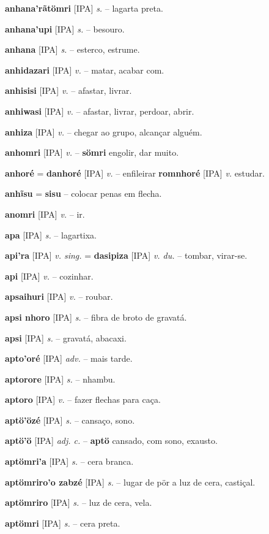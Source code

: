 \textbf{anhana'rãtömri} [IPA] \textit{s.} -- lagarta preta.

\textbf{anhana'upi} [IPA] \textit{s.} -- besouro.

\textbf{anhana} [IPA] \textit{s.} -- esterco, estrume.

\textbf{anhidazari} [IPA] \textit{v.} -- matar, acabar com.

\textbf{anhisisi} [IPA] \textit{v.} -- afastar, livrar.

\textbf{anhiwasi} [IPA] \textit{v.} -- afastar, livrar, perdoar, abrir.

\textbf{anhiza} [IPA] \textit{v.} -- chegar ao grupo, alcançar alguém.

\textbf{anhomri} [IPA] \textit{v.} -- \textbf{sömri} engolir, dar muito.

\textbf{anhoré} = \textbf{danhoré} [IPA] \textit{v.} -- enfileirar  \textbf{romnhoré} [IPA] \textit{v.} estudar.

\textbf{anhĩsu} = \textbf{sisu} -- colocar penas em flecha.

\textbf{anomri} [IPA] \textit{v.} -- ir.

\textbf{apa} [IPA] \textit{s.} -- lagartixa.

\textbf{api'ra} [IPA] \textit{v. sing.} = \textbf{dasipiza} [IPA] \textit{v. du.} -- tombar, virar-se.

\textbf{api} [IPA] \textit{v.} -- cozinhar.

\textbf{apsaihuri} [IPA] \textit{v.} -- roubar.

\textbf{apsi nhoro} [IPA] \textit{s.} -- fibra de broto de gravatá.

\textbf{apsi} [IPA] \textit{s.} -- gravatá, abacaxi.

\textbf{apto'oré} [IPA] \textit{adv.} -- mais tarde.

\textbf{aptorore} [IPA] \textit{s.} -- nhambu.

\textbf{aptoro} [IPA] \textit{v.} -- fazer flechas para caça.

\textbf{aptö'özé} [IPA] \textit{s.} -- cansaço, sono.

\textbf{aptö'ö} [IPA] \textit{adj. c.} -- \textbf{aptö} cansado, com sono, exausto.

\textbf{aptömri'a} [IPA] \textit{s.} -- cera branca.

\textbf{aptömriro'o zabzé} [IPA] \textit{s.} -- lugar de pör a luz de cera, castiçal.

\textbf{aptömriro} [IPA] \textit{s.} -- luz de cera, vela.

\textbf{aptömri} [IPA] \textit{s.} -- cera preta.


